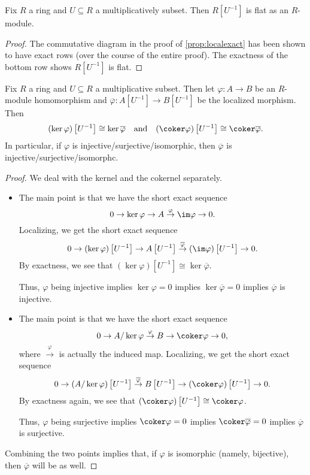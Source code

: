 \begin{corollary}
	Fix $R$ a ring and $U\subseteq R$ a multiplicatively subset. Then $R\left[U^{-1}\right]$ is flat as an $R$-module.
\end{corollary}
\begin{proof}
	The commutative diagram in the proof of \autoref{prop:localexact} has been shown to have exact rows (over the course of the entire proof). The exactness of the bottom row shows $R\left[U^{-1}\right]$ is flat.
\end{proof}
\begin{corollary} \label{cor:localizekercoker}
	Fix $R$ a ring and $U\subseteq R$ a multiplicative subset. Then let $\varphi:A\to B$ be an $R$-module homomorphism and $\overline\varphi:A\left[U^{-1}\right]\to B\left[U^{-1}\right]$ be the localized morphism. Then
	\[(\ker\varphi)\left[U^{-1}\right]\cong\ker\overline\varphi\quad\text{and}\quad(\coker\varphi)\left[U^{-1}\right]\cong\coker\overline\varphi.\]
	In particular, if $\varphi$ is injective/surjective/isomorphic, then $\overline\varphi$ is injective/surjective/isomorphc.
\end{corollary}
\begin{proof}
	We deal with the kernel and the cokernel separately.
	\begin{itemize}
		\item The main point is that we have the short exact sequence
		\[0\to\ker\varphi\to A\stackrel\varphi\to\im\varphi\to0.\]
		Localizing, we get the short exact sequence
		\[0\to(\ker\varphi)\left[U^{-1}\right]\to A\left[U^{-1}\right]\stackrel{\overline\varphi}\to(\im\varphi)\left[U^{-1}\right]\to0.\]
		By exactness, we see that $(\ker\varphi)\left[U^{-1}\right]\cong\ker\overline\varphi$.
		
		Thus, $\varphi$ being injective implies $\ker\varphi=0$ implies $\ker\overline\varphi=0$ implies $\overline\varphi$ is injective.

		\item The main point is that we have the short exact sequence
		\[0\to A/\ker\varphi\stackrel\varphi\to B\to\coker\varphi\to0,\]
		where $\stackrel\varphi\to$ is actually the induced map. Localizing, we get the short exact sequence
		\[0\to(A/\ker\varphi)\left[U^{-1}\right]\stackrel{\overline\varphi}\to B\left[U^{-1}\right]\to(\coker\varphi)\left[U^{-1}\right]\to0.\]
		By exactness again, we see that $(\coker\varphi)\left[U^{-1}\right]\cong\coker\varphi$.
		
		Thus, $\varphi$ being surjective implies $\coker\varphi=0$ implies $\coker\overline\varphi=0$ implies $\overline\varphi$ is surjective.
	\end{itemize}
	Combining the two points implies that, if $\varphi$ is isomorphic (namely, bijective), then $\overline\varphi$ will be as well.
\end{proof}
